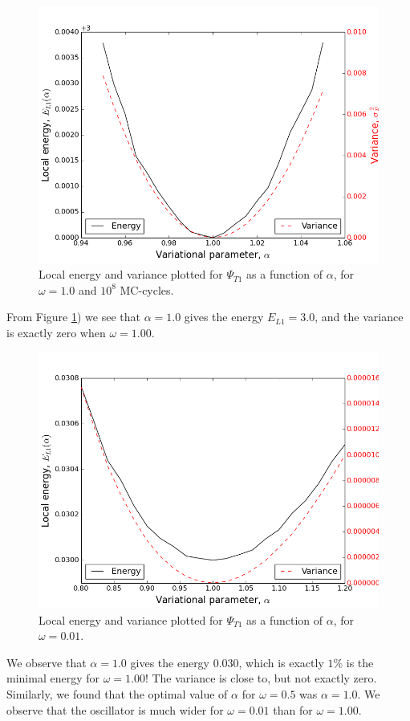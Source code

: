 \documentclass[norsk,a4paper,12pt]{article}
\begin{document}
\begin{figure} [H]
    \centering
    \includegraphics[scale=0.65]{E_L1_variance_omega=1_0}
    \caption{Local energy and variance plotted  for $\Psi_{T1}$ as a function of $\alpha$, for $\omega = 1.0$ and $10^8$ MC-cycles.}
    \label{fig:E_L1_file_omega=1_0}
\end{figure} 
From Figure \ref{fig:E_L1_file_omega=1_0}) we see that $\alpha = 1.0$ gives the energy $E_{L1}=3.0$, and the variance is exactly zero when $\omega=1.00$.

\begin{figure} [H]
    \centering
    \includegraphics[scale=0.65]{E_L1_variance_omega=0_01_1e8.png}
    \caption{Local energy and variance plotted  for $\Psi_{T1}$ as a function of $\alpha$, for $\omega = 0.01$.}
    \label{fig:E_L1_file_omega=0_01}
\end{figure} 
We observe that $\alpha = 1.0$ gives the energy 0.030, which is exactly $1\%$ is the minimal energy for $\omega=1.00$! The variance is close to, but not exactly zero. Similarly, we found that the optimal value of $\alpha$ for $\omega = 0.5$ was $\alpha = 1.0$. We observe that the oscillator is much wider for $\omega=0.01$ than for $\omega=1.00$.
\end{document}
